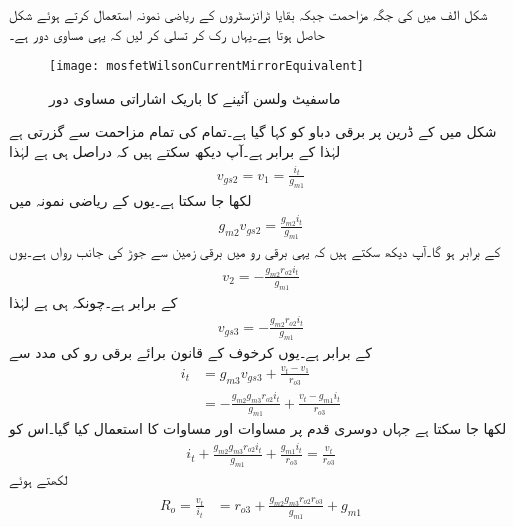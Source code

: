 شکل  الف میں  کی جگہ مزاحمت  جبکہ بقایا ٹرانزسٹروں کے ریاضی نمونہ استعمال کرتے ہوئے شکل  حاصل ہوتا ہے۔یہاں رک کر تسلی کر لیں کہ یہی مساوی دور ہے۔ 
\begin{figure}
\centering
\texttt{[image: mosfetWilsonCurrentMirrorEquivalent]}
\caption{ماسفیٹ ولسن آئینے کا باریک اشاراتی مساوی دور}
\label{شکل_تفرقی_ماسفیٹ_ولسن_مساوی_دور}
\end{figure}

شکل  میں  کے ڈرین پر برقی دباو کو  کہا گیا ہے۔تمام کی تمام  مزاحمت  سے گزرتی ہے لہٰذا  کے برابر ہے۔آپ دیکھ سکتے ہیں کہ  دراصل  ہی ہے لہٰذا
\begin{align}\label{مساوات_تفرقی_ولسن_پہلا_ماسفیٹ}
v_{gs2}=v_{1}=\frac{i_t}{g_{m1}}
\end{align}
لکھا جا سکتا ہے۔یوں  کے ریاضی نمونہ میں
\begin{align*}
g_{m2} v_{gs2}=\frac{g_{m2} i_t}{g_{m1}}
\end{align*}
کے برابر ہو گا۔آپ دیکھ سکتے ہیں کہ یہی برقی رو  میں برقی زمین سے جوڑ  کی جانب رواں ہے۔یوں
\begin{align*}
v_2=-\frac{g_{m2} r_{o2} i_t}{g_{m1}}
\end{align*}
کے برابر ہے۔چونکہ  ہی ہے لہٰذا
\begin{align}\label{مساوات_تفرقی_ماسفیٹ_ولسن_تیسرا_ماسفیٹ}
v_{gs3}=-\frac{g_{m2} r_{o2} i_t}{g_{m1}}
\end{align}
کے برابر ہے۔یوں کرخوف کے قانون برائے برقی رو کی مدد سے
\begin{align*}
i_t&=g_{m3} v_{gs3}+\frac{v_t-v_1}{r_{o3}}\\
&=-\frac{g_{m2} g_{m3} r_{o2} i_t}{g_{m1}}+\frac{v_t-g_{m1} i_t}{r_{o3}}
\end{align*}
لکھا جا سکتا ہے جہاں دوسری قدم پر مساوات  اور مساوات  کا استعمال کیا گیا۔اس کو
\begin{align*}
i_t+\frac{g_{m2} g_{m3} r_{o2} i_t}{g_{m1}}+\frac{g_{m1} i_t}{r_{o3}}=\frac{v_t}{r_{o3}}
\end{align*}
لکھتے ہوئے
\begin{gather}
\begin{aligned}
R_o=\frac{v_t}{i_t}&=r_{o3}+\frac{g_{m2}g_{m3} r_{o2} r_{o3} }{g_{m1}} +g_{m1}
\end{aligned}
\end{gather}
